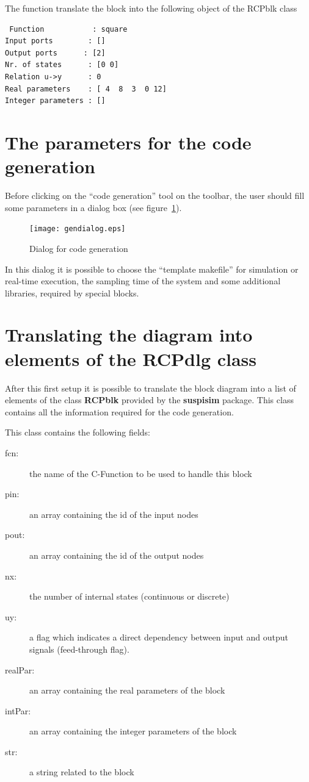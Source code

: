  The function translate the block into the following object of the RCPblk class
 
 \begin{verbatim}
 Function           : square
Input ports        : []
Output ports      : [2]
Nr. of states      : [0 0]
Relation u->y      : 0
Real parameters    : [ 4  8  3  0 12]
Integer parameters : []
\end{verbatim}

\section{The parameters for the code generation}

Before clicking on the ``code generation'' tool on the toolbar, the user should 
fill some parameters in a dialog box (see figure~\ref{codedlg}).

 \begin{figure}[htbp]	%
 \centering
 \texttt{[image: gendialog.eps]}
 \caption{Dialog for code generation}
 \label{codedlg}
 \end{figure}

In this dialog it is possible to choose the ``template makefile'' for 
simulation or real-time execution, the sampling time of the system and some 
additional libraries, required by special blocks.

\section{Translating the diagram into elements of the RCPdlg class}
\label{Sect-IO}

After this first setup it is possible to translate the block diagram into a 
list of elements of the class \textbf{RCPblk} provided by the 
\textbf{suspisim} package. This class contains all the information required 
for the code generation.

This class contains the following fields:

\begin{description}
\item[fcn:] the name of the C-Function to be used to handle this block
\item [pin:] an array containing the id of the input nodes
\item [pout:] an array containing the id of the output nodes
\item [nx:] the number of internal states (continuous or discrete)
\item [uy:] a flag which indicates a direct dependency between input and 
output signals (feed-through flag).
\item [realPar:] an array containing the real parameters of the block
\item [intPar:] an array containing the integer parameters of the block
\item [str:] a string related to the block
\end{description}

